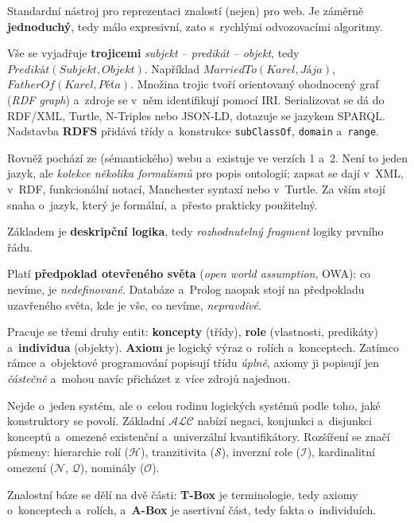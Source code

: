 \documentclass[11pt,a4paper]{article}
\theoremstyle{definition}
\begin{document}
\begin{defbox}
Standardní nástroj pro reprezentaci znalostí (nejen) pro web. Je záměrně \textbf{jednoduchý},
tedy málo expresivní, zato s~rychlými odvozovacími algoritmy.

Vše se vyjadřuje \textbf{trojicemi} \emph{subjekt -- predikát -- objekt}, tedy
$\mathit{Predikát}(\mathit{Subjekt},\mathit{Objekt})$. Například
$\mathit{MarriedTo}(\mathit{Karel},\mathit{Jája})$,
$\mathit{FatherOf}(\mathit{Karel},\mathit{Péťa})$.
Množina trojic tvoří orientovaný ohodnocený graf (\emph{RDF graph}) a~zdroje se v~něm
identifikují pomocí IRI. Serializovat se dá do RDF/XML, Turtle, N-Triples nebo JSON-LD,
dotazuje se jazykem SPARQL. Nadstavba \textbf{RDFS} přidává třídy a~konstrukce
\texttt{subClassOf}, \texttt{domain} a~\texttt{range}.
\end{defbox}

\begin{defbox}
Rovněž pochází ze (sémantického) webu a~existuje ve verzích 1 a~2. Není to jeden jazyk, ale
\emph{kolekce několika formalismů} pro popis ontologií; zapsat se dají v~XML, v~RDF, funkcionální
notací, Manchester syntaxí nebo v~Turtle. Za vším stojí snaha o~jazyk, který je formální,
a~přesto prakticky použitelný.

Základem je \textbf{deskripční logika}, tedy \emph{rozhodnutelný fragment} logiky prvního řádu.

Platí \textbf{předpoklad otevřeného světa} (\emph{open world assumption}, OWA): co nevíme, je
\emph{nedefinované}. Databáze a~Prolog naopak stojí na předpokladu uzavřeného světa, kde je vše,
co nevíme, \emph{nepravdivé}.
\end{defbox}

\begin{defbox}
Pracuje se třemi druhy entit: \textbf{koncepty} (třídy), \textbf{role} (vlastnosti, predikáty)
a~\textbf{individua} (objekty). \textbf{Axiom} je logický výraz o~rolích a~konceptech. Zatímco
rámce a~objektové programování popisují třídu \emph{úplně}, axiomy ji popisují jen
\emph{částečně} a~mohou navíc přicházet z~více zdrojů najednou.

Nejde o~jeden systém, ale o~celou rodinu logických systémů podle toho, jaké konstruktory se
povolí. Základní $\mathcal{ALC}$ nabízí negaci, konjunkci a~disjunkci konceptů a~omezené
existenční a~univerzální kvantifikátory. Rozšíření se značí písmeny: hierarchie rolí
($\mathcal{H}$), tranzitivita ($\mathcal{S}$), inverzní role ($\mathcal{I}$), kardinalitní
omezení ($\mathcal{N}$, $\mathcal{Q}$), nominály ($\mathcal{O}$).

Znalostní báze se dělí na dvě části: \textbf{T-Box} je terminologie, tedy axiomy o~konceptech
a~rolích, a~\textbf{A-Box} je asertivní část, tedy fakta o~individuích.
\end{defbox}
\end{document}
